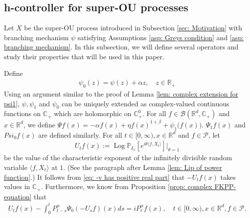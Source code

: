 \documentclass[12pt,a4paper]{amsart}
\theoremstyle{plain}
\theoremstyle{definition}
\numberwithin{equation}{section}
\begin{document}
\subsection{h-controller for super-OU processes}
\label{sec: h-controller}
Let $X$ be the super-OU process introduced in Subsection \ref{sec: Motivation} with branching mechanism $\psi$ satisfying
Assumptions \ref{asp: Greys condition} and \ref{asp: branching mechanism}.
In this subsection, we will define several operators and study their properties that will be used in this paper.

Define
\begin{align}
  \label{eq: psi 0}
  \psi_0(z)
  = \psi(z) + \alpha z
  , \quad z\in \mathbb{R}_+
\end{align}
Using an argument similar to the proof  of Lemma \ref{lem: complex extension for psi1},
$\psi, \psi_1$ and $\psi_0$ 
can be uniquely extended as complex-valued continuous functions on $\mathbb C_+$ which are holomorphic on $\mathbb C^0_+$.
For all $f\in \mathcal B(\mathbb R^d, \mathbb C_+)$ and $x\in \mathbb R^d$, we define
$\Psi f (x) = -\alpha f(x) + \eta f(x)^{1+\beta} + \psi_1\big(f(x)\big)$. $\Psi_1 f(x)$ and
$Psi_0 f(x)$ are defined similarly.
For all $t\in [0,\infty), x\in \mathbb R^d $ and $f \in \mathcal{P}$, let
\begin{align}
  \label{eq: def of U_t}
  U_tf(x) 
  := \operatorname{Log} \mathbb P_{\delta_x}[e^{i\theta \langle f, X_t\rangle}]|_{\theta = 1}
\end{align}
be the value of the characteristic exponent of the infinitely divisible random variable $\langle f, X_t\rangle$ at $1$.
(See the paragraph after Lemma \ref{lem: Lip of power function}.)
It follows from \eqref{eq: -v has positive real part} that $-U_tf(x)$ takes values in $\mathbb C_+$. Furthermore, we know from Proposition \ref{prop: complex FKPP-equation} that
\begin{align}
  \label{eq:chareq2}
  U_tf(x) - \int_0^t P^\alpha_{t-s} \Psi_0(-U_sf)(x)ds
  = i P^{\alpha}_t f(x)
  , \quad t\in [0,\infty), x\in \mathbb{R}^d, f\in \mathcal P.
\end{align}
\end{document}
